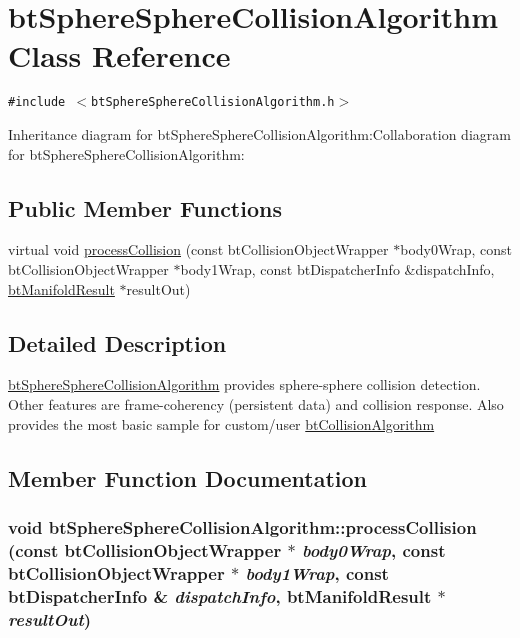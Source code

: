 \hypertarget{classbt_sphere_sphere_collision_algorithm}{
\section{btSphereSphereCollisionAlgorithm Class Reference}
\label{classbt_sphere_sphere_collision_algorithm}
}
{\tt \#include $<$btSphereSphereCollisionAlgorithm.h$>$}

Inheritance diagram for btSphereSphereCollisionAlgorithm:Collaboration diagram for btSphereSphereCollisionAlgorithm:\subsection*{Public Member Functions}
\begin{CompactItemize}
\item 
virtual void \hyperlink{classbt_sphere_sphere_collision_algorithm_7e5adac437f8c0cdb738360d5946a65d}{processCollision} (const btCollisionObjectWrapper $\ast$body0Wrap, const btCollisionObjectWrapper $\ast$body1Wrap, const btDispatcherInfo \&dispatchInfo, \hyperlink{classbt_manifold_result}{btManifoldResult} $\ast$resultOut)
\end{CompactItemize}


\subsection{Detailed Description}
\hyperlink{classbt_sphere_sphere_collision_algorithm}{btSphereSphereCollisionAlgorithm} provides sphere-sphere collision detection. Other features are frame-coherency (persistent data) and collision response. Also provides the most basic sample for custom/user \hyperlink{classbt_collision_algorithm}{btCollisionAlgorithm} 

\subsection{Member Function Documentation}
\hypertarget{classbt_sphere_sphere_collision_algorithm_7e5adac437f8c0cdb738360d5946a65d}{
\subsubsection[processCollision]{\setlength{\rightskip}{0pt plus 5cm}void btSphereSphereCollisionAlgorithm::processCollision (const btCollisionObjectWrapper $\ast$ {\em body0Wrap}, \/  const btCollisionObjectWrapper $\ast$ {\em body1Wrap}, \/  const btDispatcherInfo \& {\em dispatchInfo}, \/  {\bf btManifoldResult} $\ast$ {\em resultOut})}}
\label{classbt_sphere_sphere_collision_algorithm_7e5adac437f8c0cdb738360d5946a65d}




